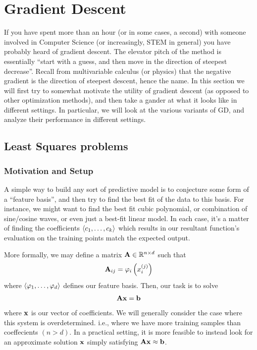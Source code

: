 \section{Gradient Descent}
If you have spent more than an hour (or in some cases, a second) with someone involved in Computer Science (or increasingly, STEM in general) you have probably heard of gradient descent. The elevator pitch of the method is essentially ``start with a guess, and then move in the direction of steepest decrease''. Recall from multivariable calculus (or physics) that the negative gradient is the direction of steepest descent, hence the name. In this section we will first try to somewhat motivate the utility of gradient descent (as opposed to other optimization methods), and then take a gander at what it looks like in different settings. In particular, we will look at the various variants of GD, and analyze their performance in different settings.

\subsection{Least Squares problems}
\subsubsection{Motivation and Setup}
A simple way to build any sort of predictive model is to conjecture some form of a ``feature basis'', and then try to find the best fit of the data to this basis. For instance, we might want to find the best fit cubic polynomial, or combination of sine/cosine waves, or even just a best-fit linear model. In each case, it's a matter of finding the coefficients $\langle c_1, \dots, c_k \rangle$ which results in our resultant function's evaluation on the training points match the expected output.

More formally, we may define a matrix $\mathbf{A} \in \mathbb{R}^{n \times d}$ such that
\begin{align*}
    \mathbf{A}_{ij} = \varphi_i\left(x^{(j)}_i\right)
\end{align*}
where $\langle \varphi_1, \dots, \varphi_d \rangle$ defines our feature basis. Then, our task is to solve
\begin{align*}
    \mathbf{A}\mathbf{x} = {\bf b}
\end{align*}
where $\mathbf{x}$ is our vector of coefficients. We will generally consider the case where this system is overdetermined. i.e., where we have more training samples than coeffecients $(n > d)$. In a practical setting, it is more feasible to instead look for an approximate solution $\mathbf{x}$ simply satisfying $\mathbf{A}\mathbf{x} \approx {\bf b}$.

